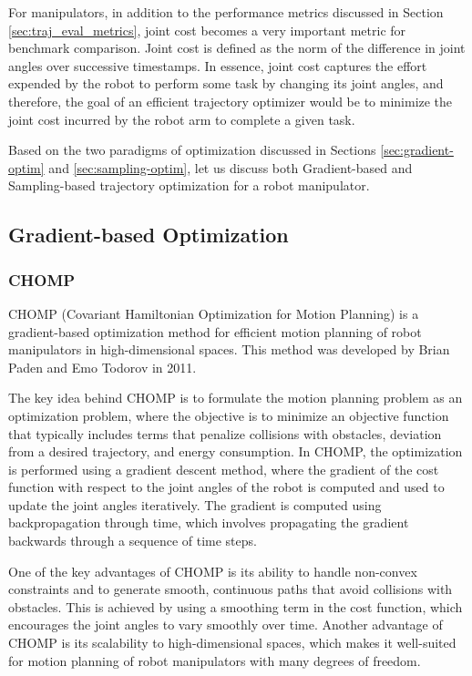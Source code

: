 For manipulators, in addition to the performance metrics discussed in Section \ref{sec:traj_eval_metrics}, joint cost becomes a very important metric for benchmark comparison. Joint cost is defined as the norm of the difference in joint angles over successive timestamps. In essence, joint cost captures the effort expended by the robot to perform some task by changing its joint angles, and therefore, the goal of an efficient trajectory optimizer would be to minimize the joint cost incurred by the robot arm to complete a given task. 

Based on the two paradigms of optimization discussed in Sections \ref{sec:gradient-optim} and \ref{sec:sampling-optim}, let us discuss both Gradient-based and Sampling-based trajectory optimization for a robot manipulator.

\subsection{Gradient-based Optimization}\label{sec:bg-gradient-manipulator}

\subsubsection{CHOMP}\label{sec:CHOMP}

CHOMP (Covariant Hamiltonian Optimization for Motion Planning)\cite{CHOMP} is a gradient-based optimization method for efficient motion planning of robot manipulators in high-dimensional spaces. This method was developed by Brian Paden and Emo Todorov in 2011.

The key idea behind CHOMP is to formulate the motion planning problem as an optimization problem, where the objective is to minimize an objective function that typically includes terms that penalize collisions with obstacles, deviation from a desired trajectory, and energy consumption. In CHOMP, the optimization is performed using a gradient descent method, where the gradient of the cost function with respect to the joint angles of the robot is computed and used to update the joint angles iteratively. The gradient is computed using backpropagation through time, which involves propagating the gradient backwards through a sequence of time steps.

One of the key advantages of CHOMP is its ability to handle non-convex constraints and to generate smooth, continuous paths that avoid collisions with obstacles. This is achieved by using a smoothing term in the cost function, which encourages the joint angles to vary smoothly over time. Another advantage of CHOMP is its scalability to high-dimensional spaces, which makes it well-suited for motion planning of robot manipulators with many degrees of freedom.

